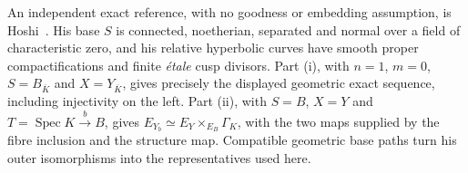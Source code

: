 An independent exact reference, with no goodness or embedding assumption,
is Hoshi~\cite[Proposition 2.4(i),(ii), pp.~169--172]{B_Hoshi2014}.
His base $S$ is connected, noetherian, separated and normal over a field
of characteristic zero, and his relative hyperbolic curves have smooth
proper compactifications and finite \emph{\'etale} cusp divisors.
Part (i), with $n=1$, $m=0$, $S=B_{\overline K}$ and
$X=Y_{\overline K}$, gives precisely the displayed geometric exact
sequence, including injectivity on the left. Part (ii), with
$S=B$, $X=Y$ and $T=\operatorname{Spec}K\xrightarrow{b}B$, gives
$E_{Y_b}\simeq E_Y\times_{E_B}\Gamma_K$, with the two maps supplied
by the fibre inclusion and the structure map. Compatible geometric
base paths turn his outer isomorphisms into the representatives used
here.

